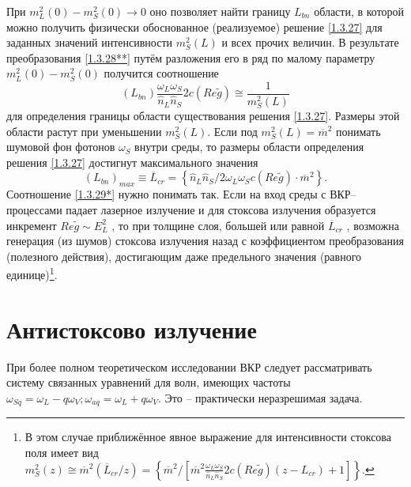 \documentclass[a4paper]{article}
\begin{document}
При $m_{L}^{2}(0)-m_{S}^{2}(0)\rightarrow0$  оно позволяет найти границу $L_{bn}$  области, в которой можно получить физически обоснованное (реализуемое) решение \eqref{1.3.27} для заданных значений интенсивности $m_{S}^{2}(L)$  и всех прочих величин. В результате преобразования \eqref{1.3.28**} путём разложения его в ряд по малому параметру $m_{L}^{2}(0)-m_{S}^{2}(0)$  получится соотношение 
\begin{equation}
	(L_{bn})\frac{\omega_{L}\omega_{S}}{\hat{n}_{L}\hat{n}_{S}}2c(Re\tilde{g})\cong\frac{1}{m_{S}^{2}(L)}
	\label{1.3.29}
\end{equation}
для определения границы области существования решения \eqref{1.3.27}. Размеры этой области растут при уменьшении $m_{S}^{2}(L)$. Если под $m_{S}^{2}(L)=\overline{m}^{2}$ понимать шумовой фон фотонов $\omega_{S}$ внутри среды, то размеры области определения решения \eqref{1.3.27} достигнут максимального значения 
\begin{equation}
	(L_{bn})_{max}\equiv\overline{L}_{cr}=\left\{\hat{n}_{L}\hat{n}_{S}/2\omega_{L}\omega_{S}c(Re\tilde{g})\cdot\overline{m}^{2}\right\}.
	\tag{29*}\label{1.3.29*}
\end{equation}
Соотношение \eqref{1.3.29*} нужно понимать так. Если на вход среды с ВКР–процессами падает лазерное излучение и для стоксова излучения образуется инкремент $Re\tilde{g}\sim E_{L}^{2}$ , то при толщине слоя, большей или равной $\overline{L}_{cr}$ , возможна генерация (из шумов) стоксова излучения назад с коэффициентом преобразования (полезного действия), достигающим даже предельного значения (равного единице)\footnote{В этом случае приближённое явное выражение для интенсивности стоксова поля имеет вид $m_{S}^{2}(z)\cong\overline{m}^{2}(\overline{L}_{cr}/z)=\left\{\overline{m}^{2}/\left[\overline{m}^{2}\frac{\omega_{L}\omega_{S}}{\hat{n}_{L}\hat{n}_{S}}2c(Re\tilde{g})(z-L_{cr})+1\right]\right\}.$}. 
\section{Антистоксово излучение}
При более полном теоретическом исследовании ВКР следует рассматривать систему связанных уравнений для волн, имеющих частоты $\omega_{Sq}=\omega_{L}-q\omega_{V};\omega_{aq}=\omega_{L}+q\omega_{V}$. Это -- практически неразрешимая задача. 
\end{document}
